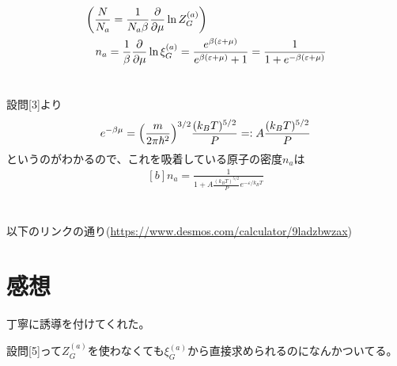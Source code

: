 \documentclass[../ap_2020.tex]{subfiles}
\begin{document}
\section{}
\begin{equation}\begin{aligned}[b]
    &\left(\frac{N}{N_a} = \frac{1}{N_a\beta}\pdv{\mu}\ln Z_G^{(a)}\right)\\
    &\quad n_a = \frac{1}{\beta}\pdv{\mu}\ln\xi_G^{(a)}
    =\frac{e^{\beta(\varepsilon+\mu)}}{e^{\beta(\varepsilon+\mu)}+1}
    =\frac{1}{1+e^{-\beta(\varepsilon+\mu)}}
\end{aligned}\end{equation}

\section{}
設問[3]より
\begin{equation}\begin{aligned}[b]
    e^{-\beta\mu}=\qty(\frac{m}{2\pi\hbar^2})^{3/2}\frac{(k_BT)^{5/2}}{P}=:A\frac{(k_BT)^{5/2}}{P}
\end{aligned}\end{equation}
というのがわかるので、これを吸着している原子の密度\(n_a\)は
\begin{equation}\begin{aligned}[b]
    n_a = \frac{1}{1+A\frac{(k_BT)^{5/2}}{P}e^{-\varepsilon/k_BT}}
\end{aligned}\end{equation}

\section{}
以下のリンクの通り(\url{https://www.desmos.com/calculator/9ladzbwzax})

\section*{感想}
丁寧に誘導を付けてくれた。


設問[5]って\(Z_G^{(a)}\)を使わなくても\(\xi_G^{(a)}\)から直接求められるのになんかついてる。
\end{document}
